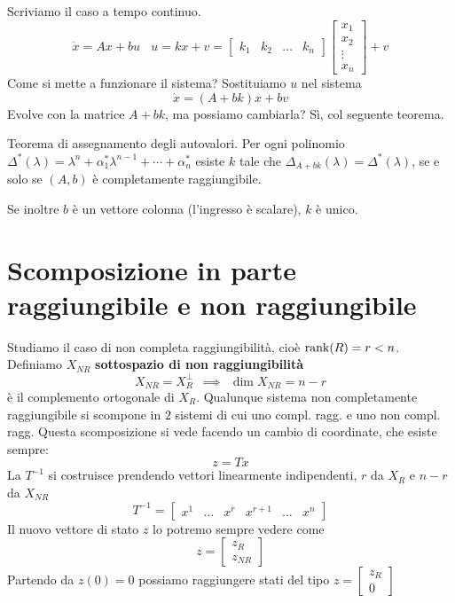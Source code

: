 Scriviamo il caso a tempo continuo.
\begin{equation*}
	\dot{x} =Ax+bu\ \ \ \ \boxed{u=kx+v} =\begin{bmatrix}
	k_1 & k_2 & \dotsc  & k_n
	\end{bmatrix}\begin{bmatrix}
	x_1\\
	x_2\\
	\vdots \\
	x_n
	\end{bmatrix} +v
\end{equation*}
Come si mette a funzionare il sistema? Sostituiamo $u$ nel sistema
\begin{equation*}
	\boxed{\dot{x} =(A+bk) x+bv}
\end{equation*}
Evolve con la matrice $A+bk$, ma possiamo cambiarla? Sì, col seguente teorema.
\begin{thm}
	Teorema di assegnamento degli autovalori. Per ogni polinomio $\Delta ^{*}(\lambda) =\lambda ^n +\alpha ^{*}_1 \lambda ^{n-1} +\cdots +\alpha ^{*}_n$ esiste $k$ tale che $\Delta _{A+bk}(\lambda) =\Delta ^{*}(\lambda)$, se e solo se $(A,b)$ è completamente raggiungibile.
\end{thm}

Se inoltre $b$ è un vettore colonna (l'ingresso è scalare), $k$ è unico.

\section{Scomposizione in parte raggiungibile e non raggiungibile}

Studiamo il caso di non completa raggiungibilità, cioè $\operatorname*{rank}(R) =r< n$. Definiamo $X_{NR}$ \textbf{sottospazio di non raggiungibilità}
\begin{equation*}
	X_{NR} =X^{\perp }_R \ \ \implies \ \ \dim X_{NR} =n-r
\end{equation*}
è il complemento ortogonale di $X_R$. Qualunque sistema non completamente raggiungibile si scompone in $2$ sistemi di cui uno compl. ragg. e uno non compl. ragg. Questa scomposizione si vede facendo un cambio di coordinate, che esiste sempre:
\begin{equation*}
	z=Tx
\end{equation*}
La $T^{-1}$ si costruisce prendendo vettori linearmente indipendenti, $r$ da $X_R$ e $n-r$ da $X_{NR}$
\begin{equation*}
	T^{-1} =\begin{bmatrix}
	x^1 & \dotsc  & x^r & x^{r+1} & \dotsc  & x^n
	\end{bmatrix}
\end{equation*}
Il nuovo vettore di stato $z$ lo potremo sempre vedere come
\begin{equation*}
	z=\begin{bmatrix}
	z_R\\
	z_{NR}
	\end{bmatrix}
\end{equation*}
Partendo da $z(0) =0$ possiamo raggiungere stati del tipo $z=\begin{bmatrix}
z_R\\
0
\end{bmatrix}$

